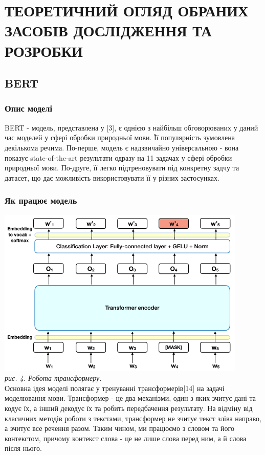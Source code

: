 \chapter{ТЕОРЕТИЧНИЙ ОГЛЯД ОБРАНИХ ЗАСОБІВ ДОСЛІДЖЕННЯ ТА РОЗРОБКИ }  

\section{BERT}
\subsection{Опис моделі}
BERT - модель, представлена у [3], є однією з найбільш обговорюваних у даний час моделей у сфері обробки природньої мови. Її популярність зумовлена декількома речима. По-перше, модель є надзвичайно універсальною  - вона показує state-of-the-art результати одразу на 11 задачах у сфері обробки природньої мови. По-друге, її легко підтреновувати під конкретну задчу та датасет, що дає можливість використовувати її у різних застосунках. 
\subsection{Як працює модель}
\includegraphics[width=450]{Dissertation/bert_arch.png}\\
\textit{рис. 4. Робота трансформеру.}\\
Основна ідея моделі полягає у тренуванні трансформерів[14] на задачі моделювання мови. Трансформер - це два механізми, один з яких зчитує дані та кодує їх, а інший декодує їх та робить передбачення результату. На відміну від класичних методів роботи з текстами, трансформер не зчитує текст зліва направо, а зчитує все речення разом. Таким чином, ми працюємо з словом та його контекстом, причому контекст слова - це не лише слова перед ним, а й слова після нього. 

